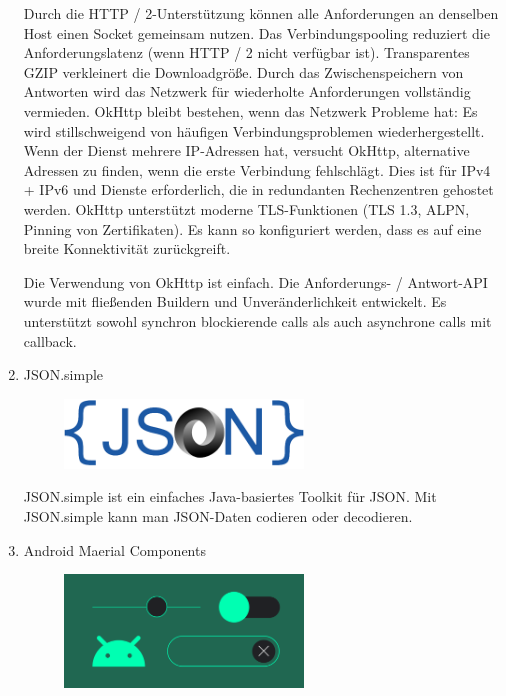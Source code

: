 \documentclass[10pt]{scrartcl}
\begin{document}
\begin{enumerate}
Durch die HTTP / 2-Unterstützung können alle Anforderungen an denselben Host einen Socket gemeinsam nutzen.
Das Verbindungspooling reduziert die Anforderungslatenz (wenn HTTP / 2 nicht verfügbar ist).
Transparentes GZIP verkleinert die Downloadgröße.
Durch das Zwischenspeichern von Antworten wird das Netzwerk für wiederholte Anforderungen vollständig vermieden.
OkHttp bleibt bestehen, wenn das Netzwerk Probleme hat: Es wird stillschweigend von häufigen Verbindungsproblemen wiederhergestellt. Wenn der Dienst mehrere IP-Adressen hat, versucht OkHttp, alternative Adressen zu finden, wenn die erste Verbindung fehlschlägt. Dies ist für IPv4 + IPv6 und Dienste erforderlich, die in redundanten Rechenzentren gehostet werden. OkHttp unterstützt moderne TLS-Funktionen (TLS 1.3, ALPN, Pinning von Zertifikaten). Es kann so konfiguriert werden, dass es auf eine breite Konnektivität zurückgreift.

Die Verwendung von OkHttp ist einfach. Die Anforderungs- / Antwort-API wurde mit fließenden Buildern und Unveränderlichkeit entwickelt. Es unterstützt sowohl synchron blockierende calls als auch asynchrone calls mit callback.


	\item
	JSON.simple
	
\begin{figure}[H]
	\centering
	\includegraphics[width=0.6\textwidth]{Bilder/BibliothekenLogos/JSONLogo.png}
\end{figure}

	
JSON.simple ist ein einfaches Java-basiertes Toolkit für JSON. Mit JSON.simple kann man JSON-Daten codieren oder decodieren.

	\item
	Android Maerial Components
	
\begin{figure}[H]
	\centering
	\includegraphics[width=0.6\textwidth]{Bilder/BibliothekenLogos/AndroidMaterialComponenLogo.png}
\end{figure}



\end{enumerate}
\end{document}
